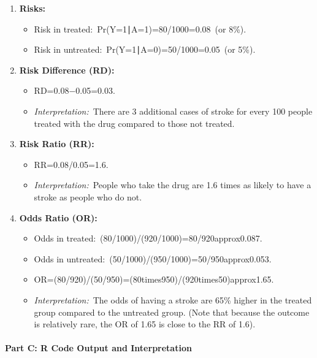 \documentclass[
  10pt,
  letterpaper,
  DIV=11,
  numbers=noendperiod]{scrartcl}
\makeatletter
\let\oldparagraph\paragraph
\renewcommand{\paragraph}{
    \@ifstar
      \xxxParagraphStar
      \xxxParagraphNoStar
  }
\newcommand{\xxxParagraphStar}[1]{\oldparagraph*{#1}\mbox{}}
\newcommand{\xxxParagraphNoStar}[1]{\oldparagraph{#1}\mbox{}}
\makeatother
\begin{document}
\begin{enumerate}
\def\labelenumi{\arabic{enumi}.}
\item
  \textbf{Risks:}

  \begin{itemize}
  \item
    Risk in treated:~Pr(Y=1∣A=1)=80/1000=0.08~(or 8\%).
  \item
    Risk in untreated:~Pr(Y=1∣A=0)=50/1000=0.05~(or 5\%).
  \end{itemize}
\item
  \textbf{Risk Difference (RD):}

  \begin{itemize}
  \item
    RD=0.08−0.05=0.03.
  \item
    \emph{Interpretation:}~There are 3 additional cases of stroke for
    every 100 people treated with the drug compared to those not
    treated.
  \end{itemize}
\item
  \textbf{Risk Ratio (RR):}

  \begin{itemize}
  \item
    RR=0.08/0.05=1.6.
  \item
    \emph{Interpretation:}~People who take the drug are 1.6 times as
    likely to have a stroke as people who do not.
  \end{itemize}
\item
  \textbf{Odds Ratio (OR):}

  \begin{itemize}
  \item
    Odds in treated:~(80/1000)/(920/1000)=80/920approx0.087.
  \item
    Odds in untreated:~(50/1000)/(950/1000)=50/950approx0.053.
  \item
    OR=(80/920)/(50/950)=(80times950)/(920times50)approx1.65.
  \item
    \emph{Interpretation:}~The odds of having a stroke are 65\% higher
    in the treated group compared to the untreated group. (Note that
    because the outcome is relatively rare, the OR of 1.65 is close to
    the RR of 1.6).
  \end{itemize}
\end{enumerate}

\paragraph{\texorpdfstring{\textbf{Part C: R Code Output and
Interpretation}}{Part C: R Code Output and Interpretation}}\label{part-c-r-code-output-and-interpretation}
\end{document}
